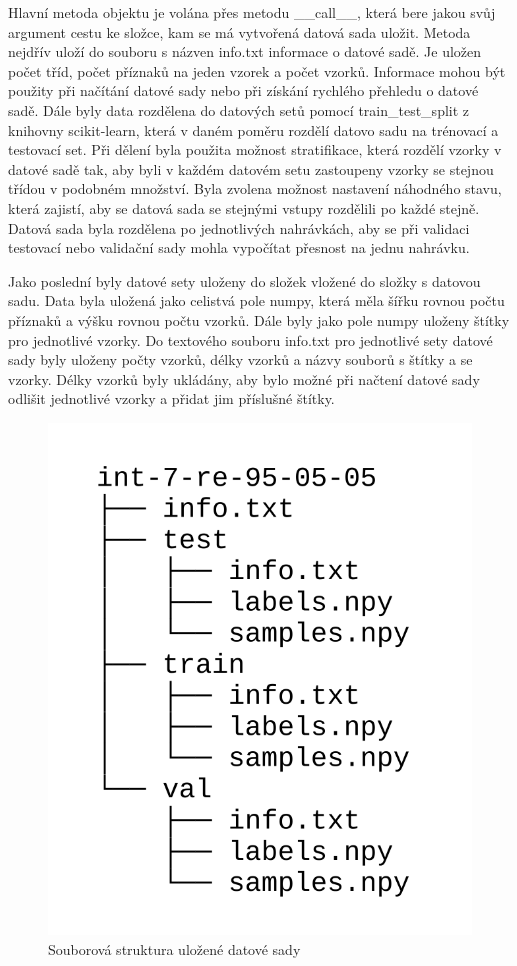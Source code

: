 \documentclass[FM,BP]{tulthesis}
\begin{document}
Hlavní metoda objektu je volána přes metodu \_\_call\_\_, která bere jakou svůj argument cestu ke složce, kam se má vytvořená datová sada uložit. Metoda nejdřív uloží do souboru s názven info.txt informace o datové sadě. Je uložen počet tříd, počet příznaků na jeden vzorek a počet vzorků. Informace mohou být použity při načítání datové sady nebo při získání rychlého přehledu o datové sadě. Dále byly data rozdělena do datových setů pomocí train\_test\_split z knihovny scikit-learn, která v daném poměru rozdělí datovo sadu na trénovací a testovací set. Při dělení byla použita možnost stratifikace, která rozdělí vzorky v datové sadě tak, aby byli v každém datovém setu zastoupeny vzorky se stejnou třídou v podobném množství. Byla zvolena možnost nastavení náhodného stavu, která zajistí, aby se datová sada se stejnými vstupy rozdělili po každé stejně. Datová sada byla rozdělena po jednotlivých nahrávkách, aby se při validaci testovací nebo validační sady mohla vypočítat přesnost na jednu nahrávku.

Jako poslední byly datové sety uloženy do složek vložené do složky s datovou sadu. Data byla uložená jako celistvá pole numpy, která měla šířku rovnou počtu příznaků a výšku rovnou počtu vzorků. Dále byly jako pole numpy uloženy štítky pro jednotlivé vzorky. Do textového souboru info.txt pro jednotlivé sety datové sady byly uloženy počty vzorků, délky vzorků a názvy souborů s štítky a se vzorky. Délky vzorků byly ukládány, aby bylo možné při načtení datové sady odlišit jednotlivé vzorky a přidat jim příslušné štítky.

\begin{figure}[htbp]
\centerline{\includegraphics[scale=.25]{dataset_file_structure.png}}
\caption{Souborová struktura uložené datové sady}
\label{fig}
\end{figure}
\end{document}
